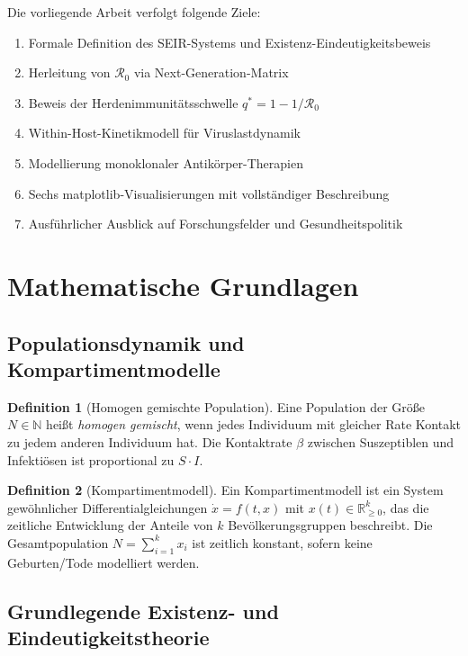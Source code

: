 ﻿\documentclass[12pt,a4paper]{article}
\theoremstyle{definition}
\newtheorem{definition}{Definition}[section]
\theoremstyle{plain}
\theoremstyle{remark}
\newcommand{\NN}{\mathbb{N}}
\newcommand{\RRR}{\mathbb{R}}
\begin{document}
Die vorliegende Arbeit verfolgt folgende Ziele:
\begin{enumerate}
  \item Formale Definition des SEIR-Systems und Existenz-Eindeutigkeitsbeweis
  \item Herleitung von $\mathcal{R}_0$ via Next-Generation-Matrix
  \item Beweis der Herdenimmunitätsschwelle $q^* = 1 - 1/\mathcal{R}_0$
  \item Within-Host-Kinetikmodell für Viruslastdynamik
  \item Modellierung monoklonaler Antikörper-Therapien
  \item Sechs matplotlib-Visualisierungen mit vollständiger Beschreibung
  \item Ausführlicher Ausblick auf Forschungsfelder und Gesundheitspolitik
\end{enumerate}

\section{Mathematische Grundlagen}

\subsection{Populationsdynamik und Kompartimentmodelle}

\begin{definition}[Homogen gemischte Population]
Eine Population der Größe $N \in \NN$ heißt \emph{homogen gemischt}, wenn jedes
Individuum mit gleicher Rate Kontakt zu jedem anderen Individuum hat.
Die Kontaktrate $\beta$ zwischen Suszeptiblen und Infektiösen ist proportional zu $S \cdot I$.
\end{definition}

\begin{definition}[Kompartimentmodell]
Ein Kompartimentmodell ist ein System gewöhnlicher Differentialgleichungen
$\dot{x} = f(t, x)$ mit $x(t) \in \RRR^k_{\geq 0}$, das die zeitliche Entwicklung
der Anteile von $k$ Bevölkerungsgruppen beschreibt.
Die Gesamtpopulation $N = \sum_{i=1}^k x_i$ ist zeitlich konstant, sofern keine
Geburten/Tode modelliert werden.
\end{definition}

\subsection{Grundlegende Existenz- und Eindeutigkeitstheorie}
\end{document}
